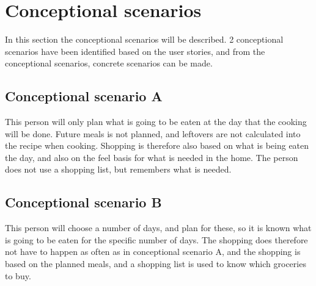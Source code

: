 \section{Conceptional scenarios}

In this section the conceptional scenarios will be described. 2 conceptional scenarios have been identified based on the user stories, and from the conceptional scenarios, concrete scenarios can be made.

\subsection{Conceptional scenario A}
This person will only plan what is going to be eaten at the day that the cooking will be done. Future meals is not planned, and leftovers are not calculated into the recipe when cooking.
Shopping is therefore also based on what is being eaten the day, and also on the feel basis for what is needed in the home. The person does not use a shopping list, but remembers what is needed.

\subsection{Conceptional scenario B}
This person will choose a number of days, and plan for these, so it is known what is going to be eaten for the specific number of days. The shopping does therefore not have to happen as often as in conceptional scenario A, and the shopping is based on the planned meals, and a shopping list is used to know which groceries to buy. 